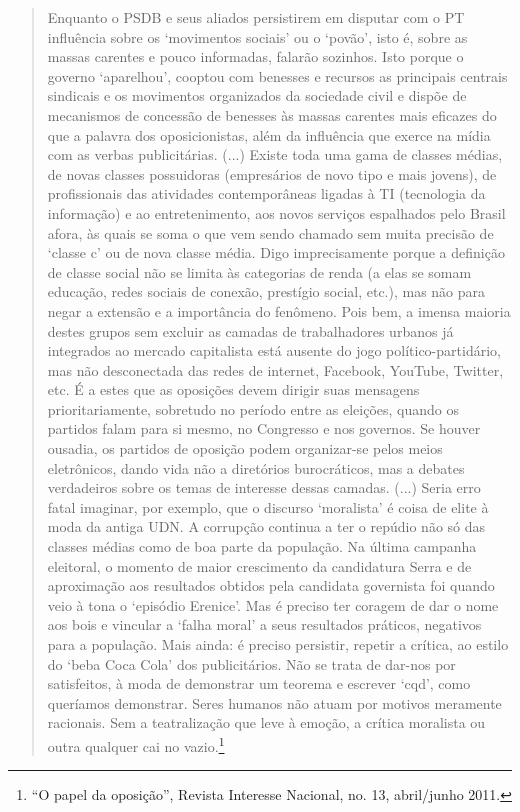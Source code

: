 \begin{quote}
Enquanto o PSDB e seus aliados persistirem em disputar com o PT
influência sobre os `movimentos sociais' ou o `povão', isto é, sobre as
massas carentes e pouco informadas, falarão sozinhos. Isto porque o
governo `aparelhou', cooptou com benesses e recursos as principais
centrais sindicais e os movimentos organizados da sociedade civil e
dispõe de mecanismos de concessão de benesses às massas carentes mais
eficazes do que a palavra dos oposicionistas, além da influência que
exerce na mídia com as verbas publicitárias. (...) Existe toda uma gama
de classes médias, de novas classes possuidoras (empresários de novo
tipo e mais jovens), de profissionais das atividades contemporâneas
ligadas à TI (tecnologia da informação) e ao entretenimento, aos novos
serviços espalhados pelo Brasil afora, às quais se soma o que vem sendo
chamado sem muita precisão de `classe c' ou de nova classe média. Digo
imprecisamente porque a definição de classe social não se limita às
categorias de renda (a elas se somam educação, redes sociais de conexão,
prestígio social, etc.), mas não para negar a extensão e a importância
do fenômeno. Pois bem, a imensa maioria destes grupos sem excluir as
camadas de trabalhadores urbanos já integrados ao mercado capitalista
está ausente do jogo político-partidário, mas não desconectada das redes
de internet, Facebook, YouTube, Twitter, etc. É a estes que as oposições
devem dirigir suas mensagens prioritariamente, sobretudo no período
entre as eleições, quando os partidos falam para si mesmo, no Congresso
e nos governos. Se houver ousadia, os partidos de oposição podem
organizar-se pelos meios eletrônicos, dando vida não a diretórios
burocráticos, mas a debates verdadeiros sobre os temas de interesse
dessas camadas. (...) Seria erro fatal imaginar, por exemplo, que o
discurso `moralista' é coisa de elite à moda da antiga UDN. A corrupção
continua a ter o repúdio não só das classes médias como de boa parte da
população. Na última campanha eleitoral, o momento de maior crescimento
da candidatura Serra e de aproximação aos resultados obtidos pela
candidata governista foi quando veio à tona o `episódio Erenice'. Mas é
preciso ter coragem de dar o nome aos bois e vincular a `falha moral' a
seus resultados práticos, negativos para a população. Mais ainda: é
preciso persistir, repetir a crítica, ao estilo do `beba Coca Cola' dos
publicitários. Não se trata de dar-nos por satisfeitos, à moda de
demonstrar um teorema e escrever `cqd', como queríamos demonstrar. Seres
humanos não atuam por motivos meramente racionais. Sem a teatralização
que leve à emoção, a crítica moralista ou outra qualquer cai no
vazio.\footnote{``O papel da oposição'', Revista Interesse Nacional,
  no. 13, abril/junho 2011.}
\end{quote} 

